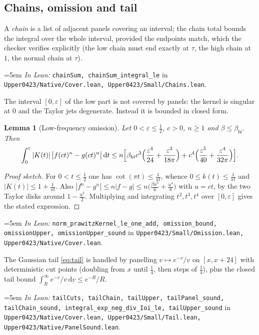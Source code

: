 \documentclass[11pt,a4paper]{article}
\newtheorem{lemma}[theorem]{Lemma}
\theoremstyle{definition}
\newcommand{\dd}{\,\mathrm{d}}
\newcommand{\Lean}[1]{\texttt{#1}}
\newcommand{\file}[1]{\texttt{#1}}
\newcommand{\formal}[2]{%
  \par\smallskip
  \begingroup\small\raggedright\emergencystretch=5em
  \noindent\textit{In Lean:} \Lean{#1} in \file{#2}.\par
  \endgroup\smallskip}
\begin{document}
\subsection{Chains, omission and tail}

A \emph{chain} is a list of adjacent panels covering an interval; the chain total
bounds the integral over the whole interval, provided the endpoints match, which
the checker verifies explicitly (the low chain must end exactly at $\tau$, the
high chain at $1$, the normal chain at $\tau$).
\formal{chainSum, chainSum\_integral\_le}{Upper0423/Native/Cover.lean, Upper0423/Small/Chains.lean}

The interval $[0,\varepsilon]$ of the low part is not covered by panels: the
kernel is singular at $0$ and the Taylor jets degenerate. Instead it is bounded
in closed form.

\begin{lemma}[Low-frequency omission]
  \label{lem:omission}
  Let $0<\varepsilon\le\tfrac12$, $c>0$, $n\ge1$ and $\beta\le\beta_{\mathrm{hi}}$.
  Then
  \[
    \int_0^\varepsilon|K(t)|\,\bigl|f(ct)^n-g(ct)^n\bigr|\dd t
    \le n\Bigl[\beta_{\mathrm{hi}}c^3\Bigl(\frac{\varepsilon^4}{24}
      +\frac{\varepsilon^3}{18\pi}\Bigr)
      + c^4\Bigl(\frac{\varepsilon^5}{40}+\frac{\varepsilon^4}{32\pi}\Bigr)\Bigr] .
  \]
\end{lemma}
\begin{proof}[Proof sketch]
  For $0<t\le\tfrac12$ one has $\cot(\pi t)\le\tfrac1{\pi t}$, whence
  $0\le k(t)\le\tfrac1{\pi t}$ and $|K(t)|\le1+\tfrac1{\pi t}$. Also
  $|f^n-g^n|\le n|f-g|\le n\bigl(\tfrac{\beta u^3}{6}+\tfrac{u^4}{8}\bigr)$ with
  $u=ct$, by the two Taylor disks around $1-\tfrac{u^2}2$. Multiplying and
  integrating $t^2,t^3,t^4$ over $[0,\varepsilon]$ gives the stated expression.
\end{proof}
\formal{norm\_prawitzKernel\_le\_one\_add, omission\_bound, omissionUpper, omissionUpper\_sound}{Upper0423/Small/Omission.lean, Upper0423/Native/Cover.lean}

The Gaussian tail \eqref{eq:tail} is handled by panelling
$v\mapsto e^{-v}/v$ on $[x,x+24]$ with deterministic cut points (doubling from
$x$ until $\tfrac14$, then steps of $\tfrac14$), plus the closed tail bound
$\int_R^\infty e^{-v}/v\dd v\le e^{-R}/R$.
\formal{tailCuts, tailChain, tailUpper, tailPanel\_sound, tailChain\_sound, integral\_exp\_neg\_div\_Ioi\_le, tailUpper\_sound}{Upper0423/Native/Cover.lean, Upper0423/Small/Tail.lean, Upper0423/Native/PanelSound.lean}
\end{document}
